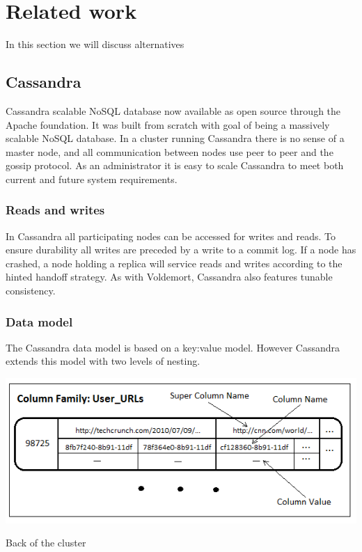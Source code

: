 \section{Related work}
In this section we will discuss alternatives 

\subsection{Cassandra}
Cassandra scalable NoSQL database now available as open source through the Apache foundation. It was built from scratch with goal of being a massively scalable NoSQL database. In a cluster running Cassandra there is no sense of a master node, and all communication between nodes use peer to peer and the gossip protocol. As an administrator it is easy to scale Cassandra to meet both current and future system requirements. 

\subsubsection{Reads and writes}
In Cassandra all participating nodes can be accessed for writes and reads. To ensure durability all writes are preceded by a write to a commit log. If a node has crashed, a node holding a replica will service reads and writes according to the hinted handoff strategy. As with Voldemort, Cassandra also features tunable consistency. 

\subsubsection{Data model}
The Cassandra data model is based on a key:value model. However Cassandra extends this model with two levels of nesting. 

\centering
\begin{minipage}[b]{0.8\linewidth}
    \includegraphics[width=1\textwidth]{resources/twitter-schema-user-urls.png}
    \caption{Back of the cluster}
    \label{fig:minipage1}
\end{minipage}

